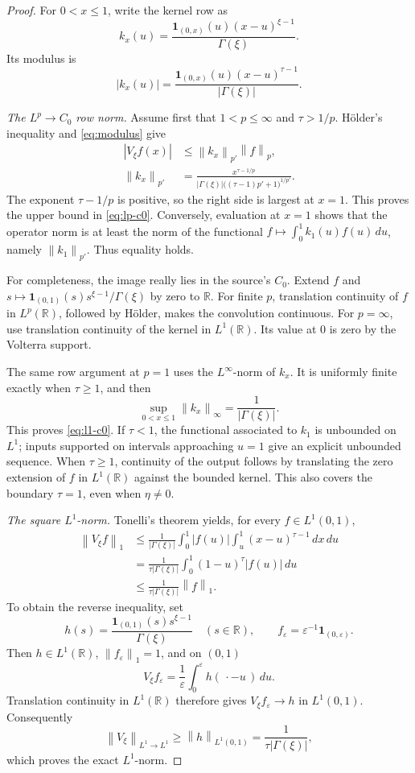 \documentclass[11pt]{article}
\newcommand{\R}{\mathbb R}
\newcommand{\1}{\mathbf 1}
\newcommand{\norm}[1]{\left\lVert #1\right\rVert}
\begin{document}
\begin{proof}
For \(0<x\le1\), write the kernel row as
\[
 k_x(u)=\frac{\1_{(0,x)}(u)(x-u)^{\xi-1}}{\Gamma(\xi)}.
\]
Its modulus is
\begin{equation}\label{eq:modulus}
 |k_x(u)|=\frac{\1_{(0,x)}(u)(x-u)^{\tau-1}}
 {|\Gamma(\xi)|}.
\end{equation}

\emph{The \(L^p\to C_0\) row norm.}
Assume first that \(1<p\le\infty\) and \(\tau>1/p\).  H\"older's inequality
and \eqref{eq:modulus} give
\begin{align}
 |V_\xi f(x)|
 &\le \norm{k_x}_{p'}\norm{f}_p,\label{eq:holder}\\
 \norm{k_x}_{p'}
 &=\frac{x^{\tau-1/p}}
 {|\Gamma(\xi)|\bigl((\tau-1)p'+1\bigr)^{1/p'}}.
 \label{eq:row}
\end{align}
The exponent \(\tau-1/p\) is positive, so the right side is largest at
\(x=1\).  This proves the upper bound in \eqref{eq:lp-c0}.  Conversely,
evaluation at \(x=1\) shows that the operator norm is at least the norm of the
functional \(f\mapsto\int_0^1 k_1(u)f(u)\,du\), namely
\(\norm{k_1}_{p'}\).  Thus equality holds.

For completeness, the image really lies in the source's \(C_0\).  Extend
\(f\) and \(s\mapsto\1_{(0,1)}(s)s^{\xi-1}/\Gamma(\xi)\) by zero to \(\R\).
For finite \(p\), translation continuity of \(f\) in \(L^p(\R)\), followed
by H\"older, makes the convolution continuous.  For \(p=\infty\), use
translation continuity of the kernel in \(L^1(\R)\).  Its value at \(0\) is
zero by the Volterra support.

The same row argument at \(p=1\) uses the \(L^\infty\)-norm of \(k_x\).
It is uniformly finite exactly when \(\tau\ge1\), and then
\[
 \sup_{0<x\le1}\norm{k_x}_\infty=\frac1{|\Gamma(\xi)|}.
\]
This proves \eqref{eq:l1-c0}.  If \(\tau<1\), the functional associated to
\(k_1\) is unbounded on \(L^1\); inputs supported on intervals approaching
\(u=1\) give an explicit unbounded sequence.  When \(\tau\ge1\), continuity
of the output follows by translating the zero extension of \(f\) in
\(L^1(\R)\) against the bounded kernel.  This also covers the boundary
\(\tau=1\), even when \(\eta\ne0\).

\emph{The square \(L^1\)-norm.}
Tonelli's theorem yields, for every \(f\in L^1(0,1)\),
\begin{align*}
 \norm{V_\xi f}_1
 &\le\frac1{|\Gamma(\xi)|}
 \int_0^1 |f(u)|\int_u^1(x-u)^{\tau-1}\,dx\,du\\
 &=\frac1{\tau|\Gamma(\xi)|}
 \int_0^1(1-u)^\tau|f(u)|\,du\\
 &\le\frac1{\tau|\Gamma(\xi)|}\norm{f}_1.
\end{align*}
To obtain the reverse inequality, set
\[
 h(s)=\frac{\1_{(0,1)}(s)s^{\xi-1}}{\Gamma(\xi)}
 \quad(s\in\R),
 \qquad
 f_\varepsilon=\varepsilon^{-1}\1_{(0,\varepsilon)}.
\]
Then \(h\in L^1(\R)\), \(\norm{f_\varepsilon}_1=1\), and on \((0,1)\)
\[
 V_\xi f_\varepsilon
 =\frac1\varepsilon\int_0^\varepsilon h(\,\cdot-u\,)\,du.
\]
Translation continuity in \(L^1(\R)\) therefore gives
\(V_\xi f_\varepsilon\to h\) in \(L^1(0,1)\).  Consequently
\[
 \norm{V_\xi}_{L^1\to L^1}
 \ge\norm{h}_{L^1(0,1)}
 =\frac1{\tau|\Gamma(\xi)|},
\]
which proves the exact \(L^1\)-norm.


\end{proof}
\end{document}
